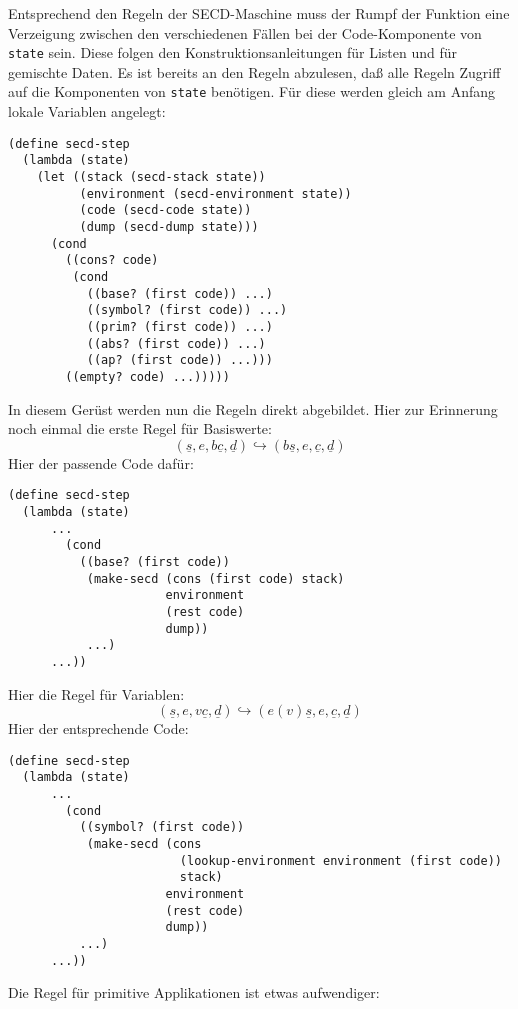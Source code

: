 %
Entsprechend den Regeln der SECD-Maschine muss der Rumpf der Funktion
eine Verzeigung zwischen den verschiedenen Fällen bei der
Code-Komponente von \texttt{state} sein.  Diese folgen den
Konstruktionsanleitungen für Listen und für gemischte Daten.  Es ist
bereits an den Regeln abzulesen, daß alle Regeln Zugriff auf die
Komponenten von \texttt{state} benötigen.  Für diese werden gleich am
Anfang lokale Variablen angelegt:
%
\begin{verbatim}
(define secd-step
  (lambda (state)
    (let ((stack (secd-stack state))
          (environment (secd-environment state))
          (code (secd-code state))
          (dump (secd-dump state)))
      (cond
        ((cons? code)
         (cond
           ((base? (first code)) ...)
           ((symbol? (first code)) ...)
           ((prim? (first code)) ...)
           ((abs? (first code)) ...)
           ((ap? (first code)) ...)))
        ((empty? code) ...)))))
\end{verbatim}
%
In diesem Gerüst werden nun die Regeln direkt abgebildet.  Hier zur
Erinnerung noch einmal die erste Regel für Basiswerte:
%
\begin{displaymath}
  (\underline{s}, e, b\underline{c}, \underline{d})
  \hookrightarrow
  (b\underline{s}, e, \underline{c}, \underline{d})
\end{displaymath}
%
Hier der passende Code dafür:
%
\begin{verbatim}
(define secd-step
  (lambda (state)
      ...
        (cond
          ((base? (first code))
           (make-secd (cons (first code) stack)
                      environment
                      (rest code)
                      dump))
           ...)
      ...))
\end{verbatim}
%
Hier die Regel für Variablen:
\begin{displaymath}
  (\underline{s}, e, v\underline{c}, \underline{d})
  \hookrightarrow
  (e(v)\underline{s}, e, \underline{c}, \underline{d})
\end{displaymath}
%
Hier der entsprechende Code:
%
\begin{verbatim}
(define secd-step
  (lambda (state)
      ...
        (cond
          ((symbol? (first code))
           (make-secd (cons
                        (lookup-environment environment (first code))
                        stack)
                      environment
                      (rest code)
                      dump))
          ...)
      ...))
\end{verbatim}
%
Die Regel für primitive Applikationen ist etwas aufwendiger:
